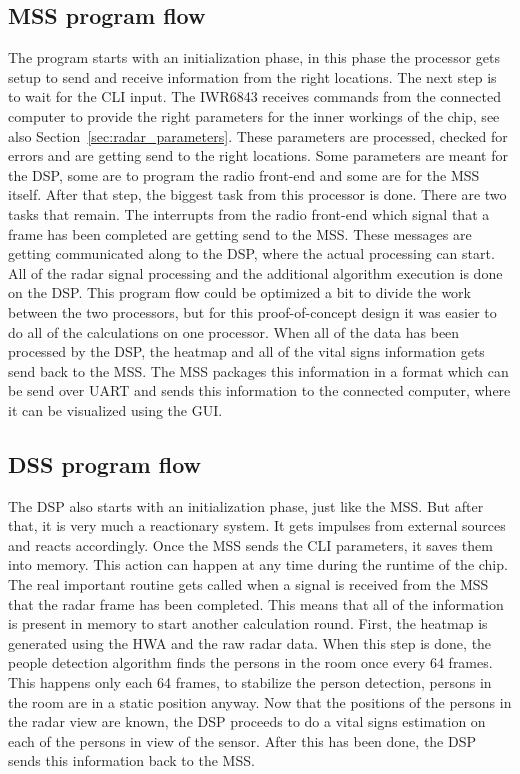 \subsection{MSS program flow}
The program starts with an initialization phase, in this phase the processor gets setup to send and receive information from the right locations. The next step is to wait for the CLI input. The IWR6843 receives commands from the connected computer to provide the right parameters for the inner workings of the chip, see also Section~\ref{sec:radar_parameters}. These parameters are processed, checked for errors and are getting send to the right locations. Some parameters are meant for the DSP, some are to program the radio front-end and some are for the MSS itself. After that step, the biggest task from this processor is done. There are two tasks that remain. The interrupts from the radio front-end which signal that a frame has been completed are getting send to the MSS. These messages are getting communicated along to the DSP, where the actual processing can start. All of the radar signal processing and the additional algorithm execution is done on the DSP. This program flow could be optimized a bit to divide the work between the two processors, but for this proof-of-concept design it was easier to do all of the calculations on one processor. When all of the data has been processed by the DSP, the heatmap and all of the vital signs information gets send back to the MSS. The MSS packages this information in a format which can be send over UART and sends this information to the connected computer, where it can be visualized using the GUI.

\subsection{DSS program flow}
The DSP also starts with an initialization phase, just like the MSS. But after that, it is very much a reactionary system. It gets impulses from external sources and reacts accordingly. Once the MSS sends the CLI parameters, it saves them into memory. This action can happen at any time during the runtime of the chip. The real important routine gets called when a signal is received from the MSS that the radar frame has been completed. This means that all of the information is present in memory to start another calculation round. First, the heatmap is generated using the HWA and the raw radar data. When this step is done, the people detection algorithm finds the persons in the room once every 64 frames. This happens only each 64 frames, to stabilize the person detection, persons in the room are in a static position anyway. Now that the positions of the persons in the radar view are known, the DSP proceeds to do a vital signs estimation on each of the persons in view of the sensor. After this has been done, the DSP sends this information back to the MSS.

